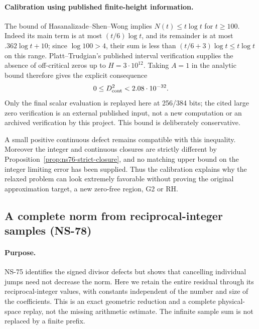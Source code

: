 \documentclass[11pt]{article}
\theoremstyle{remark}
\begin{document}
\paragraph{Calibration using published finite-height information.}
The bound of Hasanalizade--Shen--Wong
\cite[Corollary 1.2]{HasanalizadeShenWong2022} implies
$N(t)\leq t\log t$ for $t\geq100$. Indeed its main term is at most
$(t/6)\log t$, and its remainder is at most
$.362\log t+10$; since $\log100>4$, their sum is less than
$(t/6+3)\log t\leq t\log t$ on this range.
Platt--Trudgian's published interval verification
\cite[Theorem 1]{PlattTrudgian2021} supplies the absence of off-critical
zeros up to $H=3\cdot10^{12}$. Taking $A=1$ in the analytic bound
therefore gives the explicit consequence
\begin{equation}
 0\leq D_{\rm cont}^2<2.08\cdot10^{-32}.
 \label{eq:ns77-published-calibration}
\end{equation}
Only the final scalar evaluation is replayed here at 256/384 bits;
the cited large zero verification is an external published input,
not a new computation or an archived verification by this project.
This bound is deliberately conservative.

A small positive continuous defect remains compatible with this
inequality. Moreover the integer and continuous closures are strictly
different by Proposition~\ref{prop:ns76-strict-closure}, and no matching
upper bound on the integer limiting error has been supplied.
Thus the calibration explains why the relaxed problem can look
extremely favorable without proving the original approximation target,
a new zero-free region, G2 or RH.

\subsection{A complete norm from reciprocal-integer samples (NS-78)}
\label{sec:ns78-sampling}

\paragraph{Purpose.}
NS-75 identifies the signed divisor defects but shows that cancelling
individual jumps need not decrease the norm. Here we retain the entire
residual through its reciprocal-integer values, with constants independent
of the number and size of the coefficients. This is an exact geometric
reduction and a complete physical-space replay, not the missing arithmetic
estimate. The infinite sample sum is not replaced by a finite prefix.
\end{document}
